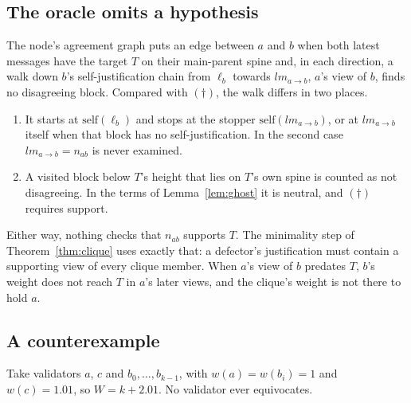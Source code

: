 \documentclass[11pt]{article}
\theoremstyle{definition}
\theoremstyle{remark}
\newcommand{\slf}{\mathrm{self}}
\begin{document}
\subsection{The oracle omits a hypothesis}

The node's agreement graph puts an edge between $a$ and $b$ when both latest
messages have the target $T$ on their main-parent spine and, in each direction,
a walk down $b$'s self-justification chain from $\ell_b$ towards
$\mathit{lm}_{a\to b}$, $a$'s view of $b$, finds no disagreeing block. Compared
with $(\dagger)$, the walk differs in two places.
\begin{enumerate}[leftmargin=1.5em]
\item It starts at $\slf(\ell_b)$ and stops at the stopper
  $\slf(\mathit{lm}_{a\to b})$, or at $\mathit{lm}_{a\to b}$ itself when that
  block has no self-justification. In the second case
  $\mathit{lm}_{a\to b}=n_{ab}$ is never examined.
\item A visited block below $T$'s height that lies on $T$'s own spine is
  counted as not disagreeing. In the terms of Lemma~\ref{lem:ghost} it is
  neutral, and $(\dagger)$ requires support.
\end{enumerate}
Either way, nothing checks that $n_{ab}$ supports $T$. The minimality step of
Theorem~\ref{thm:clique} uses exactly that: a defector's justification must
contain a supporting view of every clique member. When $a$'s view of $b$
predates $T$, $b$'s weight does not reach $T$ in $a$'s later views, and the
clique's weight is not there to hold $a$.

\subsection{A counterexample}

Take validators $a$, $c$ and $b_0,\dots,b_{k-1}$, with $w(a)=w(b_i)=1$ and
$w(c)=1.01$, so $W=k+2.01$. No validator ever equivocates.
\end{document}
